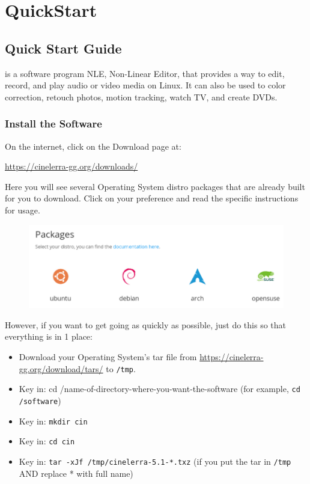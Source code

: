 \chapter{QuickStart}%
\label{cha:Quickstart}

\section{\CGG{} Quick Start Guide}%
\label{sec:cin_quick_start_guide}

\CGG{} is a software program NLE, Non-Linear Editor, that provides a way to edit, record, and play audio or video media on Linux.   It can also be used to color correction, retouch photos, motion tracking, watch TV, and create DVDs.

\subsection{Install the Software}%
\label{sub:install_software}

On the internet, click on the Download page at:
\begin{center}
	{\small \url{https://cinelerra-gg.org/downloads/}}
\end{center}
Here you will see several Operating System distro packages that are already built for you to download.  Click on your preference and read the specific instructions for usage.

\begin{figure}[htpb]
	\centering
	\includegraphics[width=1.0\linewidth]{images/packages.png}		
\end{figure}

However, if you want to get going as quickly as possible, just do this so that everything is in 1 place:

\begin{itemize}[noitemsep]
	\item Download your Operating System’s tar file from {\small \url{https://cinelerra-gg.org/download/tars/}} to \texttt{/tmp}.
	\item Key in:  cd /name-of-directory-where-you-want-the-software (for example, \texttt{cd /software})
	\item Key in:  \texttt{mkdir cin}
	\item Key in:  \texttt{cd cin}
	\item Key in:  \texttt{tar -xJf /tmp/cinelerra-5.1-*.txz}   (if you put the tar in \texttt{/tmp} AND replace * with full name)
\end{itemize}


